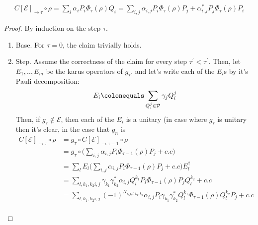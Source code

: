 \begin{claim}
  \begin{equation*}
    \begin{split}
      C[\mathcal{E}]_{\rightarrow \tau} \circ \rho = \sum_{i}\alpha_{i} P_{i} \Phi_{\tau} (\rho) Q_{i} = \sum_{i,j}\alpha_{i,j} P_{i} \Phi_{\tau} (\rho) P_{j} + \alpha_{i,j}^{*} P_{j} \Phi_{\tau} (\rho) P_{i}
    \end{split}
  \end{equation*}
\end{claim}
\begin{proof}
  By induction on the step $\tau$.  
  \begin{enumerate}
    \item Base. For $\tau=0$, the claim trivially holds. 
    \item Step. Assume the correctness of the claim for every step $\tau^{\prime} < \tau^{\prime}$. Then, let $E_{1},..,E_{m}$ be the karus operators of $g_{\tau}$, and let's write each of the $E_{i}$s by it's Pauli decomposition: 
      \begin{equation*}
        \begin{split}
          E_{i} \colonequals \sum_{Q_{i}^{j} \in \mathcal{P} } \gamma_{j}Q_{i}^{j}
        \end{split}
      \end{equation*}
      Then, if $g_{\tau} \notin  \mathcal{E}$, then each of the $E_{i}$ is a unitary (in case where $g_{\tau}$ is unitary then it's clear, in the case that $g_{n}$ is  
      \begin{equation*}
        \begin{split}
      C[\mathcal{E}]_{\rightarrow \tau} \circ \rho & =  g_{\tau} \circ C[\mathcal{E}]_{\rightarrow \tau-1} \circ \rho \\
      &= g_{\tau}\circ \bigl( \sum_{i,j}\alpha_{i,j} P_{i} \Phi_{\tau-1} (\rho) P_{j}  + c.c   \bigr) \\
      &= \sum_{l}  E_{l}  \bigl( \sum_{i,j}\alpha_{i,j} P_{i} \Phi_{\tau-1} (\rho) P_{j}  + c.c   \bigr) E_{l}^{\dagger} \\ 
      &= \sum_{l,k_{1},k_{2} i,j}  \gamma_{k_{1}}\gamma_{k_{2}}^{*}\alpha_{i,j} Q_{l}^{k_{1}}P_{i} \Phi_{\tau-1} (\rho) P_{j} Q_{l}^{k_{2}} + c.c \\
      &= \sum_{l,k_{1},k_{2} i,j} (-1)^{N_{i,j,l,k_{1},k_{2}}} \alpha_{i,j} P_{i}\gamma_{k_{1}}\gamma_{k_{2}}^{*}Q_{l}^{k_{1}}\Phi_{\tau-1} (\rho)  Q_{l}^{k_{2}} P_{j} + c.c \\
        \end{split}
      \end{equation*}
  \end{enumerate}
\end{proof}
